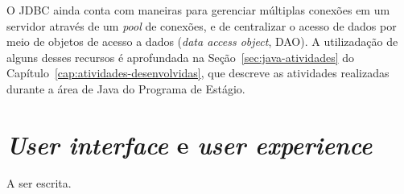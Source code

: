 O JDBC ainda conta com maneiras para gerenciar múltiplas conexões em um servidor através de um \textit{pool} de conexões, e de centralizar o acesso de dados por meio de objetos de acesso a dados (\textit{data access object}, DAO). A utilizadação de alguns desses recursos é aprofundada na Seção~\ref{sec:java-atividades} do Capítulo~\ref{cap:atividades-desenvolvidas}, que descreve as atividades realizadas durante a área de Java do Programa de Estágio.

\section{\textit{User interface} e \textit{user experience}}
\label{sec:user-interface-e-user-experience}

A ser escrita.
